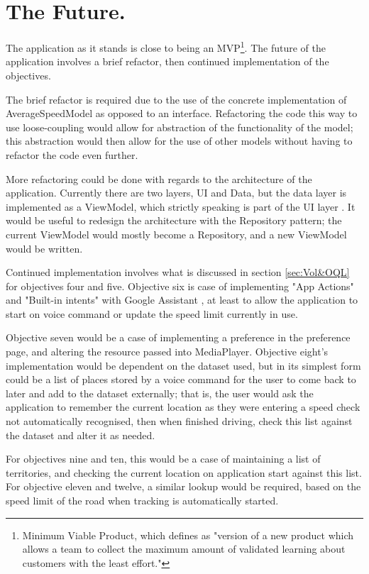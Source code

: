 \documentclass[11pt, a4paper, notitlepage]{report}
\begin{document}
\section{The Future.}
The application as it stands is close to being an MVP\footnote{Minimum Viable Product, which \citet{mvpAGuide} defines as "version of a new product which allows a team to collect the maximum amount of validated learning about customers with the least effort."}. The future of the application involves a brief refactor, then continued implementation of the objectives.

The brief refactor is required due to the use of the concrete implementation of AverageSpeedModel as opposed to an interface. Refactoring the code this way to use loose-coupling would allow for abstraction of the functionality of the model; this abstraction would then allow for the use of other models without having to refactor the code even further.

More refactoring could be done with regards to the architecture of the application. Currently there are two layers, UI and Data, but the data layer is implemented as a ViewModel, which strictly speaking is part of the UI layer \citep{UILayerAndroid}. It would be useful to redesign the architecture with the Repository pattern; the current ViewModel would mostly become a Repository, and a new ViewModel would be written.

Continued implementation involves what is discussed in section \ref{sec:Vol&OQL} for objectives four and five. Objective six is case of implementing "App Actions" and "Built-in intents" with Google Assistant \citep{appActionsBII}, at least to allow the application to start on voice command or update the speed limit currently in use.

Objective seven would be a case of implementing a preference in the preference page, and altering the resource passed into MediaPlayer. Objective eight's implementation would be dependent on the dataset used, but in its simplest form could be a list of places stored by a voice command for the user to come back to later and add to the dataset externally; that is, the user would ask the application to remember the current location as they were entering a speed check not automatically recognised, then when finished driving, check this list against the dataset and alter it as needed.

For objectives nine and ten, this would be a case of maintaining a list of territories, and checking the current location on application start against this list. For objective eleven and twelve, a similar lookup would be required, based on the speed limit of the road when tracking is automatically started.
\end{document}
